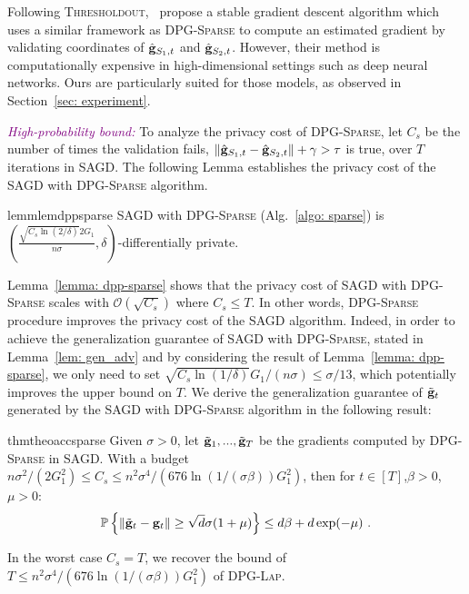 \documentclass[11pt]{article}
\begin{document}
Following \textsc{Thresholdout},~\citep{zhch2018} propose a stable gradient descent algorithm which uses a similar framework as \textsc{DPG-Sparse} to compute an estimated gradient by validating coordinates of $\hat {\mathbf{g}}_{S_1,t}$ and $\hat {\mathbf{g}}_{S_2,t}$. 
However, their method is computationally expensive in high-dimensional settings such as deep neural networks. Ours are particularly suited for those models, as observed in Section~\ref{sec: experiment}.

\textcolor{purple}{\textit{High-probability bound:}}
To analyze the privacy cost of \textsc{DPG-Sparse}, let $C_{s}$ be the number of times the validation fails, \ie $\| \hat {\mathbf{g}}_{S_1,t} - \hat {\mathbf{g}}_{S_2,t}\| + \gamma >  \tau$ is true, over $T$ iterations in \textsc{SAGD}. The following Lemma establishes the privacy cost of the \textsc{SAGD} with \textsc{DPG-Sparse} algorithm.
\begin{restatable}{lemm}{lemdppsparse}
\label{lemma: dpp-sparse}
\textsc{SAGD} with \textsc{DPG-Sparse}  (Alg.~\ref{algo: sparse}) is  
$(\frac{\sqrt{C_{s} \ln(2/\delta)} 2G_1}{n\sigma}, \delta)$-differentially private. 
\end{restatable}
Lemma~\ref{lemma: dpp-sparse} shows that the privacy cost of  \textsc{SAGD} with \textsc{DPG-Sparse} scales with $\mathcal{O}(\sqrt{C_{s}})$ where $C_{s} \leq T$. 
In other words, \textsc{DPG-Sparse} procedure improves the privacy cost of the \textsc{SAGD} algorithm. 
Indeed, in order to achieve the generalization guarantee of \textsc{SAGD} with \textsc{DPG-Sparse}, stated in Lemma~\ref{lem: gen_adv} and  by considering the result of Lemma~\ref{lemma: dpp-sparse},  we only need to set $\sqrt{C_{s} \ln(1/\delta)} G_1/(n\sigma) \leq \sigma/13$, which potentially improves the upper bound on $T$. 
We derive the generalization guarantee of $\tilde {\mathbf{g}}_t$ generated by the \textsc{SAGD} with \textsc{DPG-Sparse} algorithm in the following result:
\begin{restatable}{thm}{theoaccsparse}
\label{thm: acc_sparse}
Given $\sigma > 0$, let $\tilde {\mathbf{g}}_1,...,  \tilde {\mathbf{g}}_T$ be the gradients computed by \textsc{DPG-Sparse} in \textsc{SAGD}. With a budget $ n\sigma^2/(2G_1^2) \leq C_{s} \leq n^2 \sigma^4/(676 \ln(1/(\sigma \beta))G_1^2)$, then for $t \in [T]$,$\beta > 0$, $\mu > 0$:
        \begin{equation*}
    \mathbb{P}\left\{\|\tilde {\mathbf{g}}_t - \mathbf{g}_t\| \geq \sqrt{d}\sigma(1+\mu)\right\} \leq d\beta + d\exp(-\mu)~.
    \end{equation*}
\end{restatable}
In the worst case $C_{s} = T$, we recover the bound of $T \leq n^2 \sigma^4/(676 \ln(1/(\sigma \beta))G_1^2)$ of \textsc{DPG-Lap}.
\end{document}
